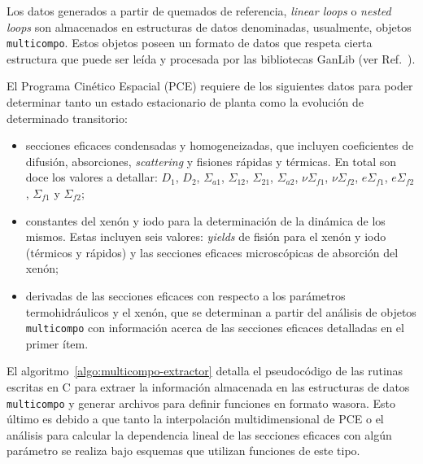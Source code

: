 \documentclass[11pt]{article}
\begin{document}
Los datos generados a partir de quemados de referencia, \emph{linear loops} o \emph{nested loops} son almacenados en estructuras de datos denominadas, usualmente, objetos \texttt{multicompo}. Estos objetos poseen un formato de datos que respeta cierta estructura que puede ser leída y procesada por las bibliotecas GanLib (ver Ref.~\cite{handbook-ganlib}).

El Programa Cinético Espacial (PCE) requiere de los siguientes datos para poder determinar tanto un estado estacionario de planta como la evolución de determinado transitorio:

\begin{itemize}
 \item secciones eficaces condensadas y homogeneizadas, que incluyen coeficientes de difusión, absorciones, \emph{scattering} y fisiones rápidas y térmicas. En total son doce los valores a detallar: $D_{1}$, $D_{2}$, $\Sigma_{a1}$, $\Sigma_{12}$, $\Sigma_{21}$, $\Sigma_{a2}$, $\nu\Sigma_{f1}$, $\nu\Sigma_{f2}$, $e\Sigma_{f1}$, $e\Sigma_{f2}$, $\Sigma_{f1}$ y $\Sigma_{f2}$;
 \item constantes del xenón y iodo para la determinación de la dinámica de los mismos. Estas incluyen seis valores: \emph{yields} de fisión para el xenón y iodo (térmicos y rápidos) y las secciones eficaces microscópicas de absorción del xenón;
 \item derivadas de las secciones eficaces con respecto a los parámetros termohidráulicos y el xenón, que se determinan a partir del análisis de objetos \texttt{multicompo} con información acerca de las secciones eficaces detalladas en el primer ítem.
\end{itemize}

El algoritmo~\ref{algo:multicompo-extractor} detalla el pseudocódigo de las rutinas escritas en C para extraer la información almacenada en las estructuras de datos \texttt{multicompo} y generar archivos para definir funciones en formato wasora. Esto último es debido a que tanto la interpolación multidimensional de PCE o el análisis para calcular la dependencia lineal de las secciones eficaces con algún parámetro se realiza bajo esquemas que utilizan funciones de este tipo.
\end{document}

